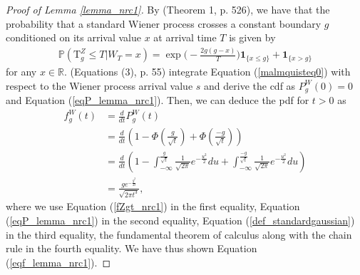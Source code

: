 \documentclass[aop]{imsart}
\theoremstyle{plain}
\theoremstyle{remark}
\newcommand{\reels}{\mathbb{R}}
\newcommand{\proba}{\mathbb{P}}
\newcommand{\Tau}{\mathrm{T}}
\begin{document}
\begin{proof}[Proof of Lemma \ref{lemma_nrc1}]
By \cite{malmquist1954certain} (Theorem 1, p. 526), we have that the probability that a standard Wiener process crosses a constant boundary $g$ conditioned on its arrival value $x$ at arrival time $T$ is given by
\begin{eqnarray}
\label{malmquisteq0}
\proba (\Tau^Z_g \leq T | W_T = x) = \exp{\Big(-\frac{2g(g-x)}{T}\Big)}\mathbf{1}_{\{x \leq g\}} + \mathbf{1}_{\{x > g\}}
\end{eqnarray}
for any $x \in \reels$. \cite{wang1997boundary} (Equations (3), p. 55) integrate Equation (\ref{malmquisteq0}) with respect to the Wiener process arrival value $s$ and derive the cdf as $P_g^W (0)  =  0$ and Equation (\ref{eqP_lemma_nrc1}). Then, we can deduce the pdf for $t>0$ as
\begin{align*}
f_g^W(t)&=\frac{d}{dt} P_g^W(t)\\
&=\frac{d}{dt}\left(1 - \Phi \left(\frac{g}{\sqrt{t}}\right) + \Phi \left(\frac{-g}{\sqrt{t}}\right)\right)\\
&=\frac{d}{dt}\left(1 - \int_{- \infty}^{\frac{g}{\sqrt{t}}} {\displaystyle {\frac {1}{ {\sqrt {2\pi }}}}e^{-{\frac {u^2}{2}}}} du + \int_{- \infty}^{\frac{- g}{\sqrt{t}}} {\displaystyle {\frac {1}{ {\sqrt {2\pi }}}}e^{-{\frac {u^2}{2}}}} du \right)\\ &=\frac{ge^{-\frac{g^2}{2t}}}{\sqrt{2\pi t^3}},
\end{align*}
where we use Equation (\ref{fZgt_nrc1}) in the first equality, Equation (\ref{eqP_lemma_nrc1}) in the second equality, Equation (\ref{def_standardgaussian}) in the third equality, the fundamental theorem of calculus along with the chain rule in the fourth equality. We have thus shown Equation (\ref{eqf_lemma_nrc1}). 


\end{proof}
\end{document}
